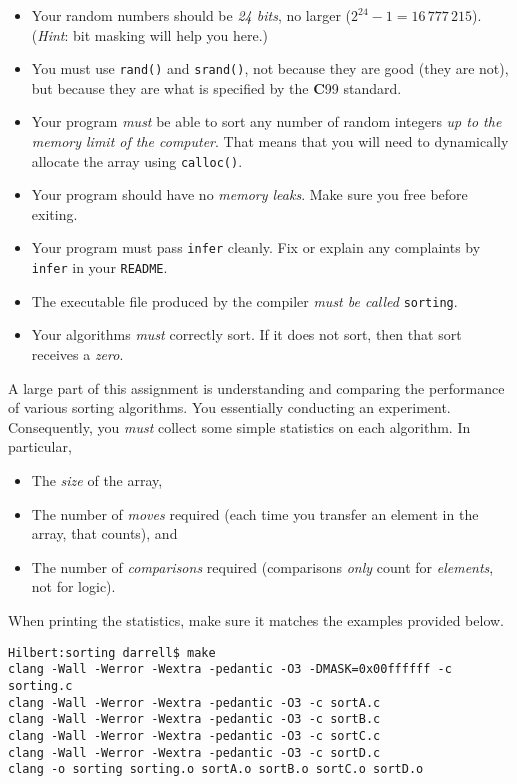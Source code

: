 \documentclass{article}
\begin{document}
\begin{itemize}
  \item Your random numbers should be \emph{24 bits}, no larger ($2^{24}-1 =
  16\,777\,215$). (\emph{Hint}: bit masking will help you here.)
  \item You must use \texttt{rand()} and \texttt{srand()}, not because they are
  good (they are not), but because they are what is specified by the
  \textbf{C}99 standard.
  \item Your program \emph{must} be able to sort any number of random integers
  \emph{up to the memory limit of the computer}. That means that you will need
  to dynamically allocate the array using \texttt{calloc()}.
  \item Your program should have no \emph{memory leaks}. Make sure you free before exiting.
  \item Your program must pass \texttt{infer} cleanly. Fix or explain any complaints by \texttt{infer} in your \texttt{README}.
  \item The executable file produced by the compiler \emph{must be called}
  \texttt{sorting}.
  \item Your algorithms \emph{must} correctly sort. If it does not sort, then that sort receives a \emph{zero}.
\end{itemize}

A large part of this assignment is understanding and comparing the performance
of various sorting algorithms. You essentially conducting an experiment. Consequently, you \emph{must} collect some simple
statistics on each algorithm. In particular,
\begin{itemize}
\item The \emph{size} of the array,
\item The number of \emph{moves} required (each time you transfer an element
in the array, that counts), and
\item The number of \emph{comparisons} required (comparisons \emph{only} count
	for \emph{elements}, not for logic).
\end{itemize}
\noindent When printing the statistics, make sure it matches the examples provided below.

\begin{lstlisting}
Hilbert:sorting darrell$ make
clang -Wall -Werror -Wextra -pedantic -O3 -DMASK=0x00ffffff -c sorting.c
clang -Wall -Werror -Wextra -pedantic -O3 -c sortA.c
clang -Wall -Werror -Wextra -pedantic -O3 -c sortB.c
clang -Wall -Werror -Wextra -pedantic -O3 -c sortC.c
clang -Wall -Werror -Wextra -pedantic -O3 -c sortD.c
clang -o sorting sorting.o sortA.o sortB.o sortC.o sortD.o
\end{lstlisting}
\end{document}
